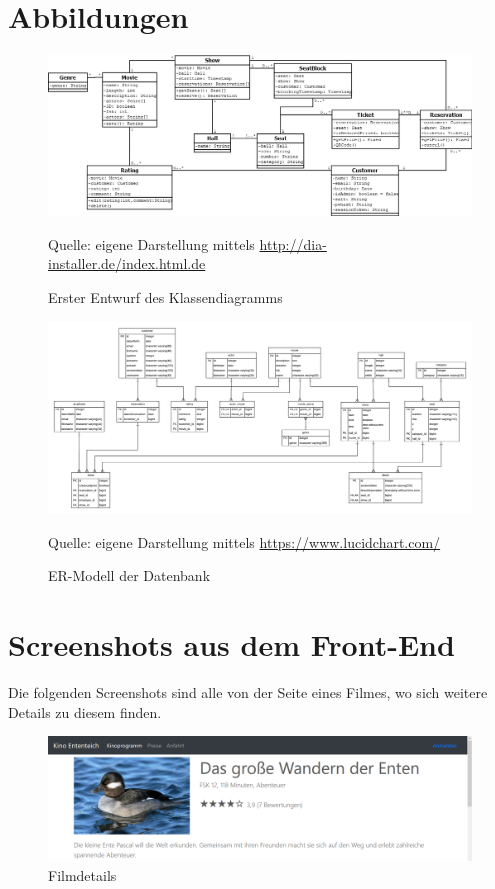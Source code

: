 \chapter{Abbildungen}
\begin{figure}
	\centering
	\includegraphics[keepaspectratio, width=\textwidth, height=\textheight]{img/klassendiagramm_v01}
	\captionsetup{format=hang}
	\caption{Erster Entwurf des Klassendiagramms}
	\small Quelle: eigene Darstellung mittels \url{http://dia-installer.de/index.html.de}
	\label{fig:anhang_klassendiagramm01}
\end{figure}

\begin{figure}
	\centering
	\includegraphics[keepaspectratio, width=\textwidth, height=\textheight]{img/ER-Modell}
	\captionsetup{format=hang}
	\caption{\acs{ER-Modell} der Datenbank}
	\small Quelle: eigene Darstellung mittels \url{https://www.lucidchart.com/}
	\label{fig:Anhang_ER-Modell}
\end{figure}

\chapter{Screenshots aus dem Front-End}
Die folgenden Screenshots sind alle von der Seite eines Filmes, wo sich weitere Details zu diesem finden.

\begin{figure}[ht]
	\centering
	\includegraphics[width=\textwidth]{img/screenshots/film02a}
	\captionsetup{format=hang}
	\caption{Filmdetails}
	\label{fig:film02a}
\end{figure}

